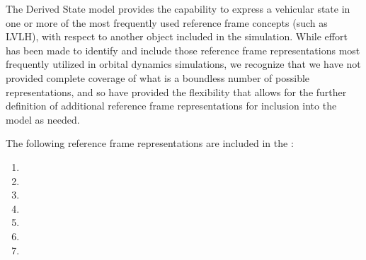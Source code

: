%
%
%
%



The Derived State model provides the capability to express a
vehicular state in one or more of the most frequently used reference frame concepts (such as LVLH), with respect to another object included in the simulation.  While effort has been made to identify and include those reference frame representations most frequently utilized in orbital dynamics simulations, we recognize that we have not provided complete coverage of what is a boundless number of possible representations, and so have provided the flexibility that allows for the further definition of additional reference frame representations for inclusion into the model as needed.

The following reference frame representations are included in the \DerivedStateDesc:

\begin{enumerate}
\item{\EulerDesc}
\item{\LVLHDesc}
\item{\NEDDesc}
\item{\OrbElemDesc}
\item{\PlanetaryDesc}
\item{\RelativeDesc}
\item{\SolarBetaDesc}
\end{enumerate}
